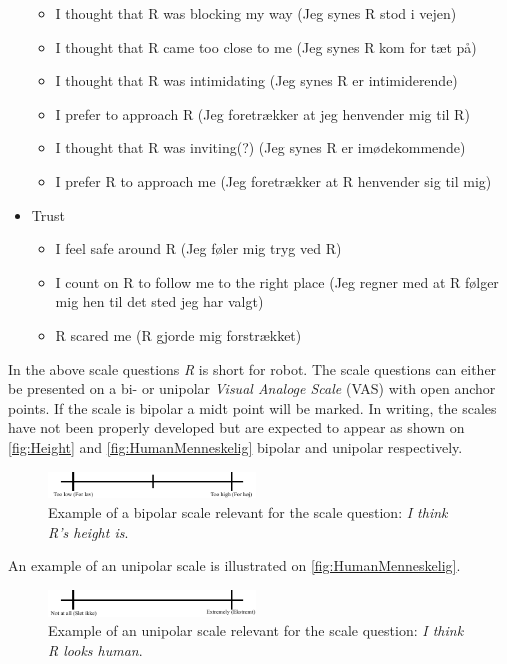 \begin{itemize}
\begin{itemize}
  \item I thought that R was blocking my way (Jeg synes R stod i vejen) 
  \item I thought that R came too close to me (Jeg synes R kom for tæt på)
  \item I thought that R was intimidating (Jeg synes R er intimiderende)
  \item I prefer to approach R (Jeg foretrækker at jeg henvender mig til R)
  \item I thought that R was inviting(?) (Jeg synes R er imødekommende)
  \item I prefer R to approach me (Jeg foretrækker at R henvender sig til mig) 
\end{itemize}
\item Trust
\begin{itemize}
  \item I feel safe around R (Jeg føler mig tryg ved R)
  \item I count on R to follow me to the right place (Jeg regner med at R følger mig hen til det sted jeg har valgt) 
  \item R scared me (R gjorde mig forstrækket)\\
\end{itemize}
\end{itemize}
%
In the above scale questions \textit{R} is short for robot. The scale questions can either be presented on a bi- or unipolar \textit{Visual Analoge Scale} (VAS) with open anchor points. If the scale is bipolar a midt point will be marked. In writing, the scales have not been properly developed but are expected to appear as shown on \autoref{fig:Height} and \autoref{fig:HumanMenneskelig} bipolar and unipolar respectively.
%
\begin{figure}[H]
\centering
\includegraphics[width = 0.49\textwidth]{Figure/HeightHoejde} 
\caption{Example of a bipolar scale relevant for the scale question: \textit{I think R's height is}.}
\label{fig:Height}
\end{figure}
\noindent
% 
An example of an unipolar scale is illustrated on \autoref{fig:HumanMenneskelig}.
%
\begin{figure}[H]
\centering
\includegraphics[width = 0.49\textwidth]{Figure/HumanMenneskelig} 
\caption{Example of an unipolar scale relevant for the scale question: \textit{I think R looks human}.}
\label{fig:HumanMenneskelig}
\end{figure}
\noindent
